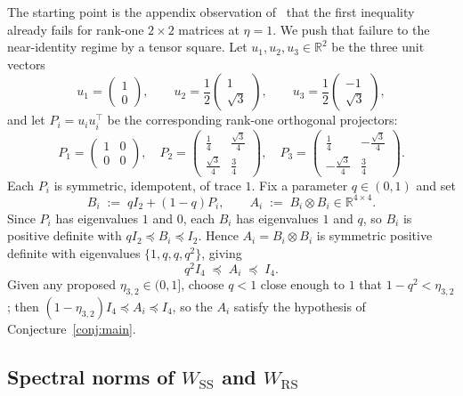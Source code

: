 \documentclass[11pt]{article}
\theoremstyle{definition}
\theoremstyle{remark}
\newcommand{\R}{\mathbb{R}}
\newcommand{\Wss}{W_{\mathrm{SS}}}
\newcommand{\Wrs}{W_{\mathrm{RS}}}
\newcommand{\psdle}{\preceq}
\begin{document}
The starting point is the appendix observation of~\cite{YSJ21open} that the first inequality already
fails for rank-one $2\times2$ matrices at $\eta=1$. We push that failure to the near-identity regime by
a tensor square. Let $u_1,u_2,u_3\in\R^2$ be the three unit vectors 
\[
u_1=\begin{pmatrix}1\\[2pt]0\end{pmatrix},\qquad
u_2=\frac12\begin{pmatrix}1\\[2pt]\sqrt3\end{pmatrix},\qquad
u_3=\frac12\begin{pmatrix}-1\\[2pt]\sqrt3\end{pmatrix},
\]
and let $P_i=u_iu_i^\top$ be the corresponding rank-one orthogonal projectors:
\begin{equation}\label{eq:proj}
P_1=\begin{pmatrix}1&0\\0&0\end{pmatrix},\quad
P_2=\begin{pmatrix}\frac14&\frac{\sqrt3}4\\[2pt]\frac{\sqrt3}4&\frac34\end{pmatrix},\quad
P_3=\begin{pmatrix}\frac14&-\frac{\sqrt3}4\\[2pt]-\frac{\sqrt3}4&\frac34\end{pmatrix}.
\end{equation}
Each $P_i$ is symmetric, idempotent, of trace $1$. Fix a parameter $q\in(0,1)$ and set
\begin{equation}\label{eq:AB}
B_i \;:=\; qI_2+(1-q)P_i,
\qquad
A_i \;:=\; B_i\otimes B_i \in \R^{4\times4}.
\end{equation}
Since $P_i$ has eigenvalues $1$ and $0$, each $B_i$ has eigenvalues $1$ and $q$, so $B_i$ is positive
definite with $qI_2\psdle B_i\psdle I_2$. Hence $A_i=B_i\otimes B_i$ is symmetric positive definite
with eigenvalues $\{1,q,q,q^2\}$, giving
\begin{equation}\label{eq:cond}
q^2 I_4\;\psdle\;A_i\;\psdle\;I_4.
\end{equation}
Given any proposed $\eta_{3,2}\in(0,1]$, choose $q<1$ close enough to $1$ that $1-q^2<\eta_{3,2}$;
then $(1-\eta_{3,2})I_4\psdle A_i\psdle I_4$, so the $A_i$ satisfy the hypothesis of
Conjecture~\ref{conj:main}. 

\subsection{Spectral norms of \texorpdfstring{$\Wss$}{WSS} and \texorpdfstring{$\Wrs$}{WRS}}
\end{document}
